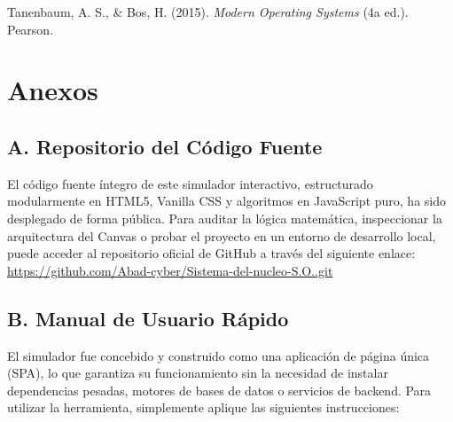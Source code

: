 \documentclass[12pt,a4paper]{article}
\begin{document}
\vspace{0.3cm}
\noindent Tanenbaum, A. S., \& Bos, H. (2015). \textit{Modern Operating Systems} (4a ed.). Pearson.

\newpage
\section*{Anexos}

\subsection*{A. Repositorio del Código Fuente}
El código fuente íntegro de este simulador interactivo, estructurado modularmente en HTML5, Vanilla CSS y algoritmos en JavaScript puro, ha sido desplegado de forma pública. Para auditar la lógica matemática, inspeccionar la arquitectura del Canvas o probar el proyecto en un entorno de desarrollo local, puede acceder al repositorio oficial de GitHub a través del siguiente enlace: \\
\url{https://github.com/Abad-cyber/Sistema-del-nucleo-S.O..git}

\subsection*{B. Manual de Usuario Rápido}
El simulador fue concebido y construido como una aplicación de página única (SPA), lo que garantiza su funcionamiento sin la necesidad de instalar dependencias pesadas, motores de bases de datos o servicios de backend. Para utilizar la herramienta, simplemente aplique las siguientes instrucciones:
\end{document}
